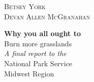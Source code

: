 	\raggedleft %
	
	\vspace*{\baselineskip} %
	
	
	\textsc{{\Large Betsey York \\
			Devan Allen McGranahan}} %
	
	\vspace*{0.167\textheight} %
	
	
	\textbf{\LARGE Why you all ought to}\\[\baselineskip] %
	
	{\textcolor{BisonGreen}{\Huge Burn more grasslands}}\\[\baselineskip] %
	
	{\Large \textit{A final report to the} \\
					National Park Service \\
					Midwest Region} %
	
	\vfill %
	
	
	{\plogo }%
	
	\vspace*{3\baselineskip} %